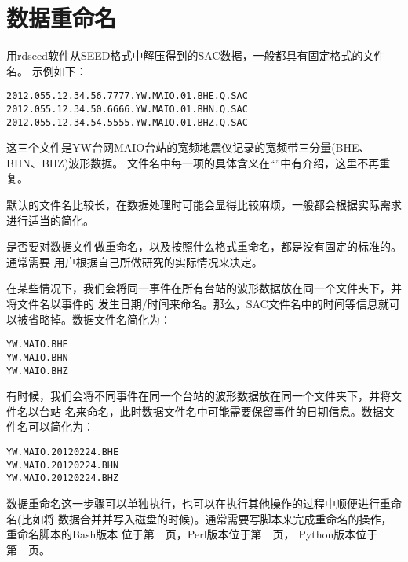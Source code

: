 \section{数据重命名}
用rdseed软件从SEED格式中解压得到的SAC数据，一般都具有固定格式的文件名。
示例如下：
\begin{verbatim}
2012.055.12.34.56.7777.YW.MAIO.01.BHE.Q.SAC
2012.055.12.34.50.6666.YW.MAIO.01.BHN.Q.SAC
2012.055.12.34.54.5555.YW.MAIO.01.BHZ.Q.SAC
\end{verbatim}
这三个文件是YW台网MAIO台站的宽频地震仪记录的宽频带三分量(BHE、BHN、BHZ)波形数据。
文件名中每一项的具体含义在``''中有介绍，这里不再重复。

默认的文件名比较长，在数据处理时可能会显得比较麻烦，一般都会根据实际需求进行适当的简化。

是否要对数据文件做重命名，以及按照什么格式重命名，都是没有固定的标准的。通常需要
用户根据自己所做研究的实际情况来决定。

在某些情况下，我们会将同一事件在所有台站的波形数据放在同一个文件夹下，并将文件名以事件的
发生日期/时间来命名。那么，SAC文件名中的时间等信息就可以被省略掉。数据文件名简化为：
\begin{verbatim}
YW.MAIO.BHE
YW.MAIO.BHN
YW.MAIO.BHZ
\end{verbatim}

有时候，我们会将不同事件在同一个台站的波形数据放在同一个文件夹下，并将文件名以台站
名来命名，此时数据文件名中可能需要保留事件的日期信息。数据文件名可以简化为：
\begin{verbatim}
YW.MAIO.20120224.BHE
YW.MAIO.20120224.BHN
YW.MAIO.20120224.BHZ
\end{verbatim}

数据重命名这一步骤可以单独执行，也可以在执行其他操作的过程中顺便进行重命名(比如将
数据合并并写入磁盘的时候)。通常需要写脚本来完成重命名的操作，重命名脚本的Bash版本
位于第~\pageref{subsec:rename-in-bash}~页，Perl版本位于第~\pageref{subsec:rename-in-perl}~页，
Python版本位于第~\pageref{subsec:rename-in-python}~页。
